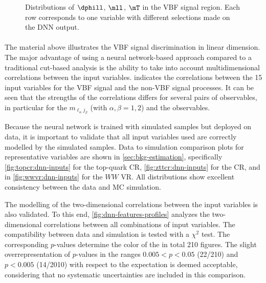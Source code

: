 \begin{figure}[h]
{        \label{fig:dnn-inputs-post-fit2-4}
    } 
    {\caption{Distributions of $\dphill$, $\mll$, $\mT$ in the VBF signal region.
        Each row corresponds to one variable with different selections made on the DNN output.
        \label{fig:dnn-inputs-post-fit2} }}
\end{figure}

\captionsetup[subfloat]{captionskip=7pt} %

\paragraph{}
The material above illustrates the VBF signal discrimination in linear dimension. The major advantage of using a neural network-based approach compared to a traditional cut-based analysis is the ability to take into account multidimensional correlations between the input variables.  indicates the correlations between the 15 input variables for the VBF signal and the non-VBF signal processes. It can be seen that the strengths of the correlations differs for several pairs of observables, in particular for the $m_{\ell_\alpha j_\beta}$ (with $\alpha, \beta = 1, 2$) and the \pTjthree observables. 

Because the neural network is trained with simulated samples but deployed on data, it is important to validate that all input variables used are correctly modelled by the simulated samples.
Data to simulation comparison plots for representative variables are shown in \cref{sec:bkg-estimation}, specifically \cref{fig:topcr:dnn-inputs} for the top-quark CR, \cref{fig:zttcr:dnn-inputs} for the \Ztautau CR, and in \cref{fig:wwvr:dnn-inputs} for the $WW$ VR. All distributions show excellent consistency between the data and MC simulation. 

The modelling of the two-dimensional correlations between the input variables is also validated.
To this end, \cref{fig:dnn-features-profiles} analyzes the two-dimensional correlations between all combinations of input variables. The compatibility between data and simulation is tested with a $\chi^2$ test. 
The corresponding $p$-values determine the color of the in total 210 figures.
The slight overrepresentation of $p$-values in the ranges $0.005 < p < 0.05$ (22/210) and $p < 0.005$ (14/2010) with respect to the expectation is deemed acceptable, considering that no systematic uncertainties are included in this comparison. 

